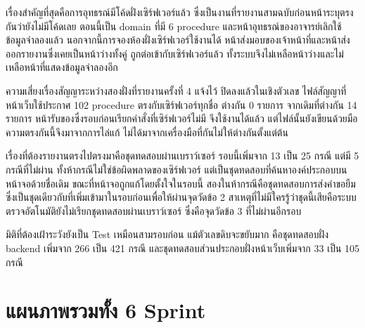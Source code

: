 เรื่องสำคัญที่สุดคือการอุทธรณ์มีโค้ดฝั่งเซิร์ฟเวอร์แล้ว ซึ่งเป็นงานที่รายงานสามฉบับก่อนหน้าระบุตรงกันว่ายังไม่มีโค้ดเลย ตอนนี้เป็น domain ที่มี 6 procedure และหน้าอุทธรณ์ของอาจารย์เลิกใช้ข้อมูลจำลองแล้ว นอกจากนี้การจองห้องฝั่งเซิร์ฟเวอร์ใช้งานได้ หน้าส่งมอบของเจ้าหน้าที่และหน้าส่งออกรายงานซึ่งเคยเป็นหน้าว่างทั้งคู่ ถูกต่อเข้ากับเซิร์ฟเวอร์แล้ว ทั้งระบบจึงไม่เหลือหน้าว่างและไม่เหลือหน้าที่แสดงข้อมูลจำลองอีก

ความเสี่ยงเรื่องสัญญาระหว่างสองฝั่งที่รายงานครั้งที่ 4 แจ้งไว้ ปิดลงแล้วในเชิงตัวเลข ไฟล์สัญญาที่หน้าเว็บใช้ประกาศ 102 procedure ตรงกับเซิร์ฟเวอร์ทุกชื่อ ต่างกัน 0 รายการ จากเดิมที่ต่างกัน 14 รายการ หน้ารับของซึ่งรอบก่อนเรียกคำสั่งที่เซิร์ฟเวอร์ไม่มี จึงใช้งานได้แล้ว แต่ไฟล์นั้นยังเขียนด้วยมือ ความตรงกันนี้จึงมาจากการไล่แก้ ไม่ได้มาจากเครื่องมือที่กันไม่ให้ต่างกันตั้งแต่ต้น

เรื่องที่ต้องรายงานตรงไปตรงมาคือชุดทดสอบผ่านเบราว์เซอร์ รอบนี้เพิ่มจาก 13 เป็น 25 กรณี แต่มี 5 กรณีที่ไม่ผ่าน ทั้งห้ากรณีไม่ใช่ข้อผิดพลาดของเซิร์ฟเวอร์ แต่เป็นชุดทดสอบที่ค้นหาองค์ประกอบบนหน้าจอด้วยชื่อเดิม ขณะที่หน้าจอถูกแก้โดยตั้งใจในรอบนี้ สองในห้ากรณีคือชุดทดสอบการส่งคำขอยืม ซึ่งเป็นชุดเดียวกับที่เพิ่มเข้ามาในรอบก่อนเพื่อให้ผ่านจุดวัดข้อ 2 สาเหตุที่ไม่มีใครรู้ว่าชุดนี้เสียคือระบบตรวจอัตโนมัติยังไม่เรียกชุดทดสอบผ่านเบราว์เซอร์ ซึ่งคือจุดวัดข้อ 3 ที่ไม่ผ่านอีกรอบ

มิติที่ต้องเฝ้าระวังยังเป็น Test เหมือนสามรอบก่อน แม้ตัวเลขดิบจะขยับมาก คือชุดทดสอบฝั่ง backend เพิ่มจาก 266 เป็น 421 กรณี และชุดทดสอบส่วนประกอบฝั่งหน้าเว็บเพิ่มจาก 33 เป็น 105 กรณี

\section{แผนภาพรวมทั้ง 6 Sprint}
\label{sec:overview}


